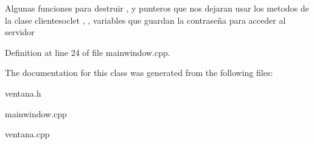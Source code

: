 Algunas funciones para destruir , y punteros que nos dejaran usar los metodos de la clase clientesoclet , , variables que guardan la contraseña para acceder al servidor 

Definition at line 24 of file mainwindow.\+cpp.



The documentation for this class was generated from the following files\+:\begin{DoxyCompactItemize}
\item 
ventana.\+h\item 
mainwindow.\+cpp\item 
ventana.\+cpp\end{DoxyCompactItemize}
